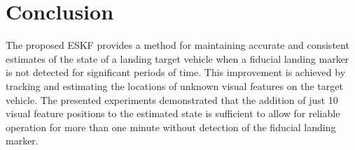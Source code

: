 \section{Conclusion} \label{sec:conclusion}
The proposed ESKF provides a method for maintaining accurate and consistent
estimates of the state of a landing target vehicle when a fiducial landing marker is
not detected for significant periods of time. This improvement is achieved by
tracking and estimating the locations of unknown visual features on the target
vehicle.
The presented experiments demonstrated that the addition of just 10 visual
feature positions to the estimated state
is sufficient to allow for reliable operation for more than one
minute without detection of the fiducial landing marker.
